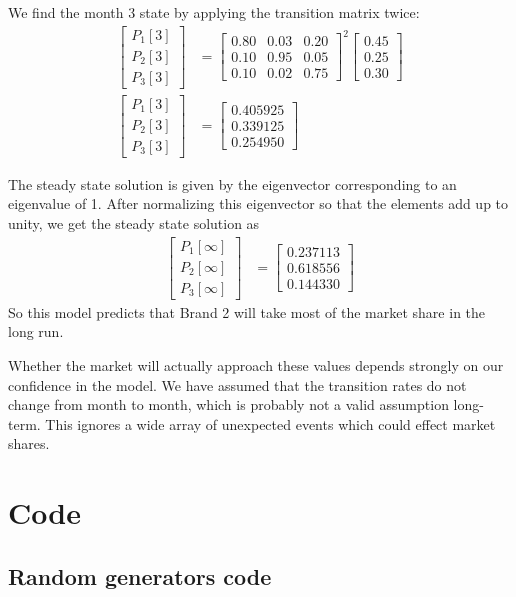\documentclass[twocolumn]{myarticle}
\newcommand{\mat}[1]{\begin{bmatrix}#1\end{bmatrix}}
\begin{document}
We find the month 3 state by applying the transition matrix twice:
\begin{align}
    \mat{P_1[3] \\ P_2[3] \\ P_3[3]} &= 
    \mat{0.80 & 0.03 & 0.20 \\
         0.10 & 0.95 & 0.05 \\
         0.10 & 0.02 & 0.75 }^2
    \mat{0.45 \\ 0.25 \\ 0.30} 
    \\
    \mat{P_1[3] \\ P_2[3] \\ P_3[3]} &= \mat{0.405925 \\ 0.339125 \\ 0.254950}
\end{align}

The steady state solution is given by the eigenvector corresponding to an eigenvalue of 1.
After normalizing this eigenvector so that the elements add up to unity, we get the steady state solution as
\begin{align}
    \mat{P_1[\infty] \\ P_2[\infty] \\ P_3[\infty]} &= \mat{0.237113 \\ 0.618556 \\ 0.144330}
\end{align}
So this model predicts that Brand 2 will take most of the market share in the long run.

Whether the market will actually approach these values depends strongly on our confidence in the model.
We have assumed that the transition rates do not change from month to month, which is probably not a valid assumption long-term.
This ignores a wide array of unexpected events which could effect market shares.

\onecolumn

\section{Code}
\label{sec:code}

\subsection{Random generators code}
\label{subsec:random_generators_code}


\vspace{10pt}
\end{document}
